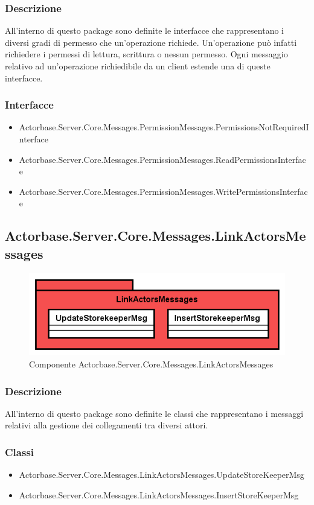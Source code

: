 \documentclass[a4paper]{article}
\begin{document}
			\subsubsection{Descrizione}
				All'interno di questo package sono definite le interfacce che rappresentano i diversi gradi di permesso che un'operazione richiede. Un'operazione può infatti richiedere i permessi di lettura, scrittura o nessun permesso. Ogni messaggio relativo ad un'operazione richiedibile da un client estende una di queste interfacce.
			\subsubsection{Interfacce}
			\begin{itemize}
				\item Actorbase.Server.Core.Messages.PermissionMessages.PermissionsNotRequiredInterface
				\item Actorbase.Server.Core.Messages.PermissionMessages.ReadPermissionsInterface
				\item Actorbase.Server.Core.Messages.PermissionMessages.WritePermissionsInterface
			\end{itemize}
			
			\subsection{Actorbase.Server.Core.Messages.LinkActorsMessages}
			\begin{figure} [H]
			\centering
			\includegraphics[scale=0.65]{Server/Package/LinkActorsMessagesLevel.png}
			\caption{Componente Actorbase.Server.Core.Messages.LinkActorsMessages}
			\end{figure}
			\subsubsection{Descrizione}
				All'interno di questo package sono definite le classi che rappresentano i messaggi relativi alla gestione dei collegamenti tra diversi attori.
			\subsubsection{Classi}
			\begin{itemize}
				\item Actorbase.Server.Core.Messages.LinkActorsMessages.UpdateStoreKeeperMsg
				\item Actorbase.Server.Core.Messages.LinkActorsMessages.InsertStoreKeeperMsg
			\end{itemize}
			
\end{document}
